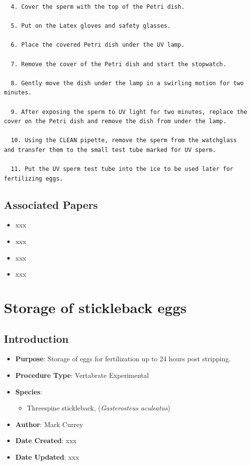 \documentclass[
  letterpaper,
  DIV=11,
  numbers=noendperiod]{scrreprt}
\providecommand{\tightlist}{%
  \setlength{\itemsep}{0pt}\setlength{\parskip}{0pt}}\usepackage{longtable,booktabs,array}
\begin{document}
\begin{verbatim}
  4. Cover the sperm with the top of the Petri dish. 
  
  5. Put on the Latex gloves and safety glasses. 
  
  6. Place the covered Petri dish under the UV lamp. 
  
  7. Remove the cover of the Petri dish and start the stopwatch. 
  
  8. Gently move the dish under the lamp in a swirling motion for two minutes. 
  
  9. After exposing the sperm to UV light for two minutes, replace the cover on the Petri dish and remove the dish from under the lamp. 
  
  10. Using the CLEAN pipette, remove the sperm from the watchglass and transfer them to the small test tube marked for UV sperm. 
  
  11. Put the UV sperm test tube into the ice to be used later for fertilizing eggs.
\end{verbatim}

\hypertarget{associated-papers-58}{%
\section{Associated Papers}\label{associated-papers-58}}

\begin{itemize}
\tightlist
\item
  xxx
\item
  xxx
\item
  xxx
\item
  xxx
\end{itemize}

\hypertarget{sec-vert_exp-egg_storage_SB}{%
\chapter{Storage of stickleback
eggs}\label{sec-vert_exp-egg_storage_SB}}

\hypertarget{introduction-90}{%
\section{Introduction}\label{introduction-90}}

\begin{itemize}
\tightlist
\item
  \textbf{Purpose}: Storage of eggs for fertilization up to 24 hours
  post stripping.
\item
  \textbf{Procedure Type}: Vertabrate Experimental
\item
  \textbf{Species}:

  \begin{itemize}
  \tightlist
  \item
    Threespine stickleback, (\emph{Gasterosteus aculeatus})
  \end{itemize}
\item
  \textbf{Author}: Mark Currey
\item
  \textbf{Date Created}: xxx
\item
  \textbf{Date Updated}: xxx
\end{itemize}
\end{document}
